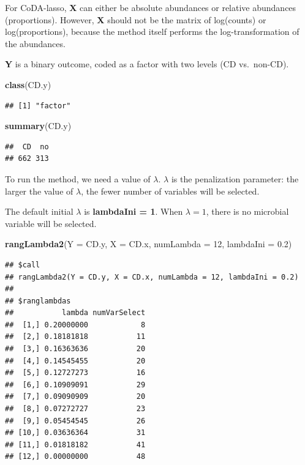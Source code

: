 \documentclass[openany]{book}
\newenvironment{Shaded}{\begin{snugshade}}{\end{snugshade}}
\newcommand{\KeywordTok}[1]{\textcolor[rgb]{0.13,0.29,0.53}{\textbf{#1}}}
\newcommand{\DataTypeTok}[1]{\textcolor[rgb]{0.13,0.29,0.53}{#1}}
\newcommand{\DecValTok}[1]{\textcolor[rgb]{0.00,0.00,0.81}{#1}}
\newcommand{\FloatTok}[1]{\textcolor[rgb]{0.00,0.00,0.81}{#1}}
\newcommand{\NormalTok}[1]{#1}
\begin{document}
For CoDA-lasso, \textbf{X} can either be absolute abundances or relative
abundances (proportions). However, \textbf{X} should not be the matrix
of log(counts) or log(proportions), because the method itself performs
the log-transformation of the abundances.

\textbf{Y} is a binary outcome, coded as a factor with two levels (CD
vs.~non-CD).

\begin{Shaded}
\begin{Highlighting}[]
\KeywordTok{class}\NormalTok{(CD.y)}
\end{Highlighting}
\end{Shaded}

\begin{verbatim}
## [1] "factor"
\end{verbatim}

\begin{Shaded}
\begin{Highlighting}[]
\KeywordTok{summary}\NormalTok{(CD.y)}
\end{Highlighting}
\end{Shaded}

\begin{verbatim}
##  CD  no 
## 662 313
\end{verbatim}

To run the method, we need a value of \(\lambda\). \(\lambda\) is the
penalization parameter: the larger the value of \(\lambda\), the fewer
number of variables will be selected.

The default initial \(\lambda\) is \textbf{lambdaIni = 1}. When
\(\lambda = 1\), there is no microbial variable will be selected.

\begin{Shaded}
\begin{Highlighting}[]
\KeywordTok{rangLambda2}\NormalTok{(}\DataTypeTok{Y =}\NormalTok{ CD.y, }\DataTypeTok{X =}\NormalTok{ CD.x, }\DataTypeTok{numLambda =} \DecValTok{12}\NormalTok{, }\DataTypeTok{lambdaIni =} \FloatTok{0.2}\NormalTok{)}
\end{Highlighting}
\end{Shaded}

\begin{verbatim}
## $call
## rangLambda2(Y = CD.y, X = CD.x, numLambda = 12, lambdaIni = 0.2)
## 
## $ranglambdas
##           lambda numVarSelect
##  [1,] 0.20000000            8
##  [2,] 0.18181818           11
##  [3,] 0.16363636           20
##  [4,] 0.14545455           20
##  [5,] 0.12727273           16
##  [6,] 0.10909091           29
##  [7,] 0.09090909           20
##  [8,] 0.07272727           23
##  [9,] 0.05454545           26
## [10,] 0.03636364           31
## [11,] 0.01818182           41
## [12,] 0.00000000           48
\end{verbatim}
\end{document}
